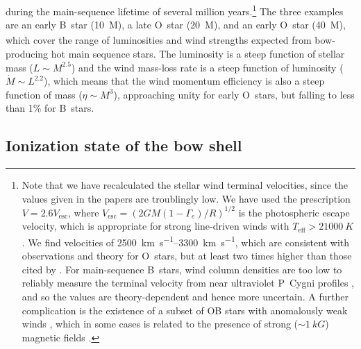 during the main-sequence lifetime of several million years.\footnote{%
  \label{fn:meyer-velocities-too-low}
  Note that we have recalculated the stellar wind terminal velocities,
  since the values given in the \citeauthor{Meyer:2014b} papers are
  troublingly low.  We have used the prescription
  \(V = 2.6 V_{\text{esc}}\), where
  \(V_{\text{esc}} = \left( 2 G M (1 - \Gamma_e)/ R \right)^{1/2}\) is the
  photospheric escape velocity, which is appropriate for strong
  line-driven winds with \(T_{\text{eff}} > \SI{21 000}{K}\)
  \citep{Lamers:1995a}.  We find velocities of
  \SIrange{2500}{3300}{km.s^{-1}}, which are consistent with
  observations and theory \citep{Vink:1999a} for O~stars, but at least
  two times higher than those cited by \citet{Meyer:2014b}. For
  main-sequence B~stars, wind column densities are too low to reliably
  measure the terminal velocity from near ultraviolet P~Cygni profiles
  \citep{Prinja:1989a}, and so the values are theory-dependent
  \citep{Krticka:2014a} and hence more uncertain.  A further
  complication is the existence of a subset of OB stars with
  anomalously weak winds \citep{Puls:2008a}, which in some cases is
  related to the presence of strong (\(\sim \SI{1}{kG}\)) magnetic fields
  \citep{Oskinova:2011b}.} %
The three examples are an early B~star (\SI{10}{M_\odot}), a late O~star
(\SI{20}{M_\odot}), and an early O~star (\SI{40}{M_\odot}), which cover the
range of luminosities and wind strengths expected from bow-producing
hot main sequence stars.  The luminosity is a steep function of
stellar mass (\(L \sim M^{2.5}\)) and the wind mass-loss rate is a steep
function of luminosity (\(\dot{M} \sim L^{2.2}\)), which means that the
wind momentum efficiency is also a steep function of mass
(\(\eta \sim M^3\)), approaching unity for early O~stars, but falling to
less than 1\% for B~stars.


\subsection{Ionization state of the bow shell}
\label{sec:trapp-ioniz-front}

\newcommand\alphaB{\ensuremath{\alpha_{\text{B}}}}
\newcommand\shell{\ensuremath{_{\text{sh}}}}


